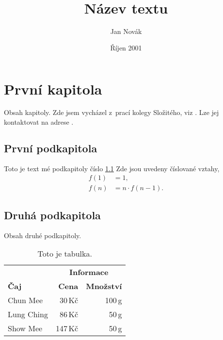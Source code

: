 \documentclass[twoside]{article}
\title{Název textu}
\author{Jan Novák}
\date{Říjen 2001}
\begin{document}
\maketitle


\section{První kapitola}
Obsah kapitoly.
Zde jsem vycházel z~prací kolegy Složitého, viz \cite{slozi}. 
Lze jej kontaktovat na adrese .

\subsection{První podkapitola}\label{kapX}
Toto je text mé podkapitoly číslo \ref{kapX}
Zde jsou uvedeny číslované vztahy,
\begin{align}
  f(1) & = 1, \\
  f(n) & = n \cdot f(n-1).
\end{align}

\subsection{Druhá podkapitola}
Obsah druhé podkapitoly.

\begin{table}[ht]
  \begin{center}
    \renewcommand{\arraystretch}{1.2}
    \begin{tabular}{||l|rr||}
      \hline
      & \multicolumn{2}{|c||}{\bf \hbox{Informace}} \\
      \cline{2-3}
      \bf Čaj & \bf Cena & \bf Množství \\
      \hline
      Chun Mee & 30\,Kč & 100\,g \\
      Lung Ching & 86\,Kč & 50\,g \\
      Show Mee & 147\,Kč & 50\,g \\
      \hline
    \end{tabular}
    \caption{Toto je tabulka.} \label{tab}
  \end{center}
\end{table}
\end{document}

